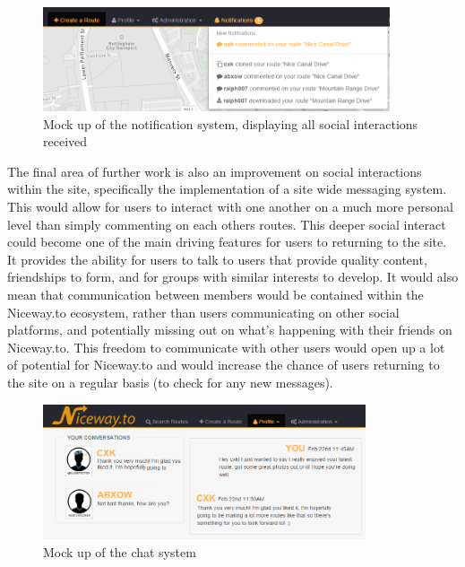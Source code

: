 \begin{figure}[!ht]
	\begin{center}
		\includegraphics[width=0.9125\textwidth]{images/further/notification.png}
	\end{center}
	\vspace{-6mm}
	\caption{Mock up of the notification system, displaying all social interactions received}	
\end{figure}

\noindent 
The final area of further work is also an improvement on social interactions within the site, specifically the implementation of a site wide messaging system. This would allow for users to interact with one another on a much more personal level than simply commenting on each others routes. This deeper social interact could become one of the main driving features for users to returning to the site. It provides the ability for users to talk to users that provide quality content, friendships to form, and for groups with similar interests to develop. It would also mean that communication between members would be contained within the Niceway.to ecosystem, rather than users communicating on other social platforms, and potentially missing out on what's happening with their friends on Niceway.to. This freedom to communicate with other users would open up a lot of potential for Niceway.to and would increase the chance of users returning to the site on a regular basis (to check for any new messages).

\begin{figure}[!ht]
	\begin{center}
		\includegraphics[width=0.85\textwidth]{images/further/chat.png}
	\end{center}
	\vspace{-6mm}
	\caption{Mock up of the chat system}	
	\vspace{-15mm}
\end{figure}


